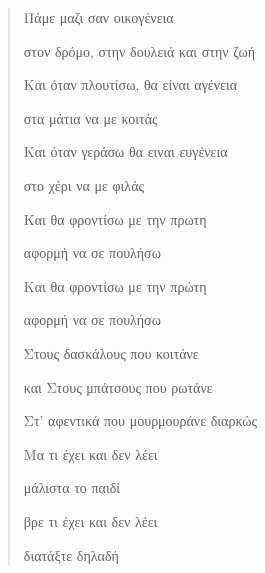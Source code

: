 \documentclass[12pt]{article}
\begin{document}
\begin{verse}
\end{verse}


\begin{verse}
  Πάμε μαζι σαν οικογένεια

  στον δρόμο, στην δουλειά και στην ζωή

  Και όταν πλουτίσω, θα είναι αγένεια

  στα μάτια να με κοιτάς

  Και όταν γεράσω θα ειναι ευγένεια

  στο χέρι να με φιλάς



  Και θα φροντίσω με την πρωτη

  αφορμή να σε πουλήσω

  Και θα φροντίσω με την πρώτη

  αφορμή να σε πουλήσω



  Στους δασκάλους που κοιτάνε

  και Στους μπάτσους που ρωτάνε

  Στ' αφεντικά που μουρμουράνε διαρκώς



  Μα τι έχει και δεν λέει

  μάλιστα το παιδί

  βρε τι έχει και δεν λέει

  διατάξτε δηλαδή


\end{verse}
\end{document}
